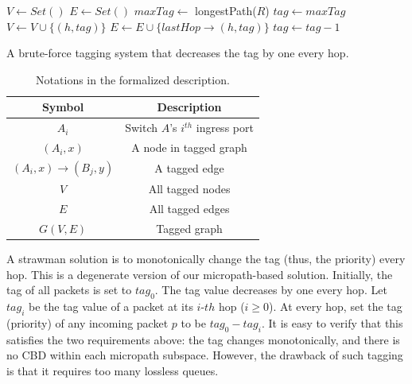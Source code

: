 \begin{algorithm}
	\small
	$V \gets Set()$\;
	$E \gets Set()$\; 
	$maxTag \gets$ longestPath($R$)\;
	 {
		$tag \gets maxTag$\;
		 {
			$V \gets V \cup \{(h, tag)\}$\;
			$E \gets E \cup \{lastHop\rightarrow(h, tag)\}$\;
			$tag \gets tag-1$\;
		}
	}
	\;
    \caption{A brute-force tagging system that decreases the tag by one every hop.}
	\label{alg:ttl}
\end{algorithm}


\begin{table}
\small
\centering
\begin{tabular}{|c|c|}
\hline
Symbol & Description \\ \hline
$A_i$ & Switch $A$'s $i^{th}$ ingress port  \\ \hline
$(A_i, x)$ & A node in tagged graph \\ \hline
$(A_i, x)\rightarrow(B_j, y)$ & A tagged edge \\ \hline
$V$ & All tagged nodes  \\ \hline
$E$ & All tagged edges \\ \hline
$G(V, E)$ & Tagged graph \\ \hline
\end{tabular}
\caption{Notations in the formalized description.}
\label{tab:symbols}
\end{table}

 A strawman solution is to monotonically change the tag (thus, the priority) every hop.
This is a degenerate version of our micropath-based solution.
Initially, the tag of all packets is set to $tag_0$. The tag value decreases by one every hop. 
Let $tag_i$ be the tag value of a packet at its $i$-$th$ hop ($i \geq 0$). At every hop, 
set the tag (priority) of any incoming packet $p$ to be $tag_0 - tag_i$. 
It is easy to verify that this satisfies the two requirements above: the tag changes monotonically, and there is no CBD
within each micropath subspace.
However, the drawback of such tagging is that it requires too many lossless queues. 
\fi

